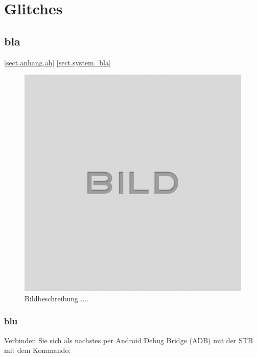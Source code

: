 
\chapter{Glitches}\label{chap.glitch}

\section{bla}\label{sect.glitch_bla}
\ref{sect.anhang.ah} 
\ref{sect.system_bla}

\begin{figure}[H]
	\centering
	\includegraphics[width=\textwidth]{images/idle.png}
	\caption{Bildbeschreibung ....}
	\label{fig.glitch.bild1}
\end{figure}

\subsection{blu}\label{sect.glitch_blu}



Verbinden Sie sich als nächstes per Android Debug Bridge (ADB) mit der STB mit dem Kommando:
\newline
\newline

 
